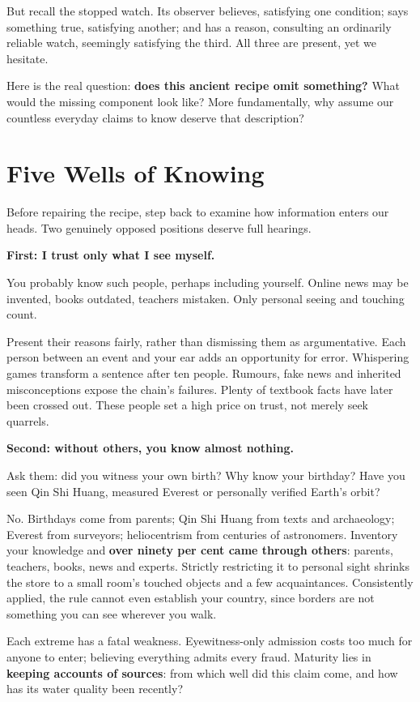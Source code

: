 But recall the stopped watch. Its observer believes, satisfying one condition; says something true, satisfying another; and has a reason, consulting an ordinarily reliable watch, seemingly satisfying the third. All three are present, yet we hesitate.

Here is the real question: \textbf{does this ancient recipe omit something?} What would the missing component look like? More fundamentally, why assume our countless everyday claims to know deserve that description?

\section{Five Wells of Knowing}
Before repairing the recipe, step back to examine how information enters our heads. Two genuinely opposed positions deserve full hearings.

\textbf{First: I trust only what I see myself.}

You probably know such people, perhaps including yourself. Online news may be invented, books outdated, teachers mistaken. Only personal seeing and touching count.

Present their reasons fairly, rather than dismissing them as argumentative. Each person between an event and your ear adds an opportunity for error. Whispering games transform a sentence after ten people. Rumours, fake news and inherited misconceptions expose the chain's failures. Plenty of textbook facts have later been crossed out. These people set a high price on trust, not merely seek quarrels.

\textbf{Second: without others, you know almost nothing.}

Ask them: did you witness your own birth? Why know your birthday? Have you seen Qin Shi Huang, measured Everest or personally verified Earth's orbit?

No. Birthdays come from parents; Qin Shi Huang from texts and archaeology; Everest from surveyors; heliocentrism from centuries of astronomers. Inventory your knowledge and \textbf{over ninety per cent came through others}: parents, teachers, books, news and experts. Strictly restricting it to personal sight shrinks the store to a small room's touched objects and a few acquaintances. Consistently applied, the rule cannot even establish your country, since borders are not something you can see wherever you walk.

Each extreme has a fatal weakness. Eyewitness-only admission costs too much for anyone to enter; believing everything admits every fraud. Maturity lies in \textbf{keeping accounts of sources}: from which well did this claim come, and how has its water quality been recently?

